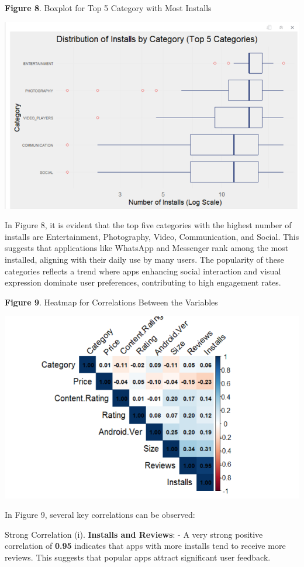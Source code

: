\documentclass[
]{article}
\begin{document}
\textbf{Figure 8}. Boxplot for Top 5 Category with Most Installs

\includegraphics{top_5_cat.png}

In Figure 8, it is evident that the top five categories with the highest
number of installs are Entertainment, Photography, Video, Communication,
and Social. This suggests that applications like WhatsApp and Messenger
rank among the most installed, aligning with their daily use by many
users. The popularity of these categories reflects a trend where apps
enhancing social interaction and visual expression dominate user
preferences, contributing to high engagement rates.

\textbf{Figure 9}. Heatmap for Correlations Between the Variables

\includegraphics{correlation.png}

In Figure 9, several key correlations can be observed:

Strong Correlation (i). \textbf{Installs and Reviews}: - A very strong
positive correlation of \textbf{0.95} indicates that apps with more
installs tend to receive more reviews. This suggests that popular apps
attract significant user feedback.
\end{document}
